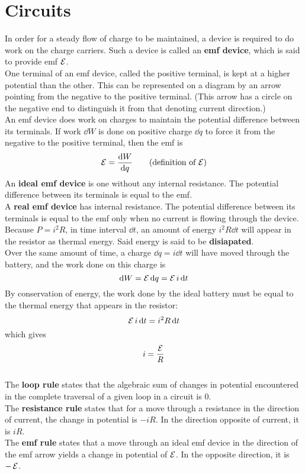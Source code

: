 \documentclass[./Electricity and Magnetism.tex]{subfiles}
\begin{document}
	\section{Circuits}
		In order for a steady flow of charge to be maintained, a device is required to do work on the charge carriers. Such a device is called an \textbf{emf device}, which is said to provide emf \(\operatorname{\mathcal{E}}\). \\
		One terminal of an emf device, called the positive terminal, is kept at a higher potential than the other. This can be represented on a diagram by an arrow pointing from the negative to the positive terminal. (This arrow has a circle on the negative end to distinguish it from that denoting current direction.) \\
		An emf device does work on charges to maintain the potential difference between its terminals. If work \(\dd{W}\) is done on positive charge \(\dd{q}\) to force it from the negative to the positive terminal, then the emf is
			\[\emf = \dv{W}{q} \tag{definition of \(\emf\)}\]
		An \textbf{ideal emf device} is one without any internal resistance. The potential difference between its terminals is equal to the emf. \\
		A \textbf{real emf device} has internal resistance. The potential difference between its terminals is equal to the emf only when no current is flowing through the device. \\
		Because \(P = i^2R\), in time interval \(\dd{t}\), an amount of energy \(i^2R\dd{t}\) will appear in the resistor as thermal energy. Said energy is said to be \textbf{disiapated}. \\
			Over the same amount of time, a charge \(\dd{q} = i\dd{t}\) will have moved through the battery, and the work done on this charge is
			\[
				\dd{W} = \operatorname{\mathcal{E}}\dd{q}
					= \operatorname{\mathcal{E}} i\dd{t}
			\]
			By conservation of energy, the work done by the ideal battery must be equal to the thermal energy that appears in the resistor:
				\[\operatorname{\mathcal{E}} i\dd{t} = i^2R\dd{t}\]
				which gives
				\[i = \frac{\operatorname{\mathcal{E}}}{R}\] \\
		The \textbf{loop rule} states that the algebraic sum of changes in potential encountered in the complete traversal of a given loop in a circuit is 0. \\
		The \textbf{resistance rule} states that for a move through a resistance in the direction of current, the change in potential is \(-iR\). In the direction opposite of current, it is \(iR\). \\
		The \textbf{emf rule} states that a move through an ideal emf device in the direction of the emf arrow yields a change in potential of \(\operatorname{\mathcal{E}}\). In the opposite direction, it is \(-\operatorname{\mathcal{E}}\). \\
\end{document}
